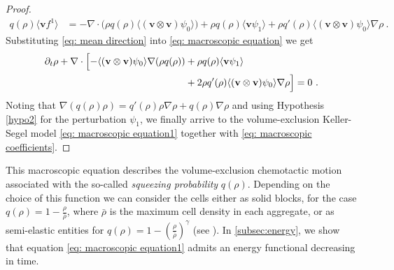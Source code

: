 \documentclass[review,onefignum,onetabnum]{siamart220329}
\begin{document}
\begin{proof}
\begin{align}
    q(\rho)\langle\mathbf{v}f^1\rangle&=- \nabla \cdot \big(\rho q(\rho) \langle(\mathbf{v}\otimes \mathbf{v})\psi_0\rangle \big)+\rho q(\rho)\langle \mathbf{v}\psi_1\rangle  +\rho q'(\rho) \langle(\mathbf{v}\otimes \mathbf{v})\psi_0\rangle  \nabla\rho\ .\label{eq: mean direction}
\end{align}
Substituting \cref{eq: mean direction} into \cref{eq: macroscopic equation} we get
\begin{align*}
    \partial_t\rho+\nabla\cdot\Bigl[-\langle(\mathbf{v}\otimes \mathbf{v}) \psi_0\rangle \nabla(\rho q(\rho))&+\rho q(\rho)\langle\mathbf{v} \psi_1\rangle \nonumber\\
    &+2 \rho q'(\rho)\langle(\mathbf{v}\otimes \mathbf{v})\psi_0\rangle\nabla\rho  \Bigr]=0\ . 
\end{align*}
Noting that $\nabla(q(\rho)\rho)=q'(\rho)\rho\nabla\rho+q(\rho)\nabla\rho$ and using Hypothesis \cref{hypo2} for the perturbation $\psi_1$, we finally arrive to the volume-exclusion Keller-Segel model \cref{eq: macroscopic equation1} together with \cref{eq: macroscopic coefficients}.
\end{proof}


This macroscopic equation describes the
volume-exclusion chemotactic motion associated with the so-called \emph{squeezing probability} $q(\rho)$. Depending on the choice of this function we can consider the cells either as solid blocks, for the case $q(\rho)=1-\frac{\rho}{\bar{\rho}}$, where $\bar{\rho}$ is the maximum cell density in each aggregate, or as semi-elastic entities for $q(\rho)=1-\left(\frac{\rho}{\bar{\rho}} \right)^\gamma$ (see \cite{wang2007classical}). {In \cref{subsec:energy}, we show that equation \cref{eq: macroscopic equation1} admits an energy functional decreasing in time}. 
\end{document}
